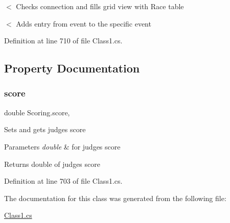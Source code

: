 $<$ Checks connection and fills grid view with Race table

$<$ Adds entry from event to the specific event 

Definition at line 710 of file Class1.\+cs.



\subsection{Property Documentation}
\mbox{\label{classScoring_a98cbf9ebbee504f67d1ebcbb45f3bf40}} 
\subsubsection{\texorpdfstring{score}{score}}
{\footnotesize\ttfamily double Scoring.\+score\hspace{0.3cm}{\ttfamily [get]}, {\ttfamily [set]}}

Sets and gets judge\textquotesingle{}s score 
\begin{DoxyParams}{Parameters}
{\em double} & for judge\textquotesingle{}s score \\
\hline
\end{DoxyParams}
\begin{DoxyReturn}{Returns}
double of judge\textquotesingle{}s score 
\end{DoxyReturn}


Definition at line 703 of file Class1.\+cs.



The documentation for this class was generated from the following file\+:\begin{DoxyCompactItemize}
\item 
\hyperlink{Class1_8cs}{Class1.\+cs}\end{DoxyCompactItemize}
